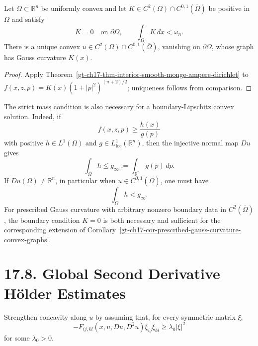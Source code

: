 \begin{corollary}
\label{gt-ch17-cor-prescribed-gauss-curvature-convex-graphs}
Let $\Omega\subset\mathbb R^n$ be uniformly convex and let
$K\in C^2(\Omega)\cap C^{0,1}(\overline\Omega)$ be positive in $\Omega$ and
satisfy
\begin{equation}\tag{17.81}
K=0\quad\text{on }\partial\Omega,
\qquad \int_\Omega K\,dx<\omega_n.
\end{equation}
There is a unique convex
$u\in C^2(\Omega)\cap C^{0,1}(\overline\Omega)$, vanishing on
$\partial\Omega$, whose graph has Gauss curvature $K(x)$.
\end{corollary}
\begin{proof}
\sketch Apply Theorem~\ref{gt-ch17-thm-interior-smooth-monge-ampere-dirichlet} to
$f(x,z,p)=K(x)(1+|p|^2)^{(n+2)/2}$; uniqueness follows from comparison.
\end{proof}

The strict mass condition is also necessary for a boundary-Lipschitz convex
solution.  Indeed, if
\begin{equation}\tag{17.82}
f(x,z,p)\ge\frac{h(x)}{g(p)}
\end{equation}
with positive $h\in L^1(\Omega)$ and
$g\in L^1_{\mathrm{loc}}(\mathbb R^n)$, then the injective normal map
$Du$ gives
\begin{equation}\tag{17.83}
\int_\Omega h\le g_\infty:=\int_{\mathbb R^n}g(p)\,dp.
\end{equation}
If $Du(\Omega)\ne\mathbb R^n$, in particular when
$u\in C^{0,1}(\overline\Omega)$, one must have
\begin{equation}\tag{17.84}
\int_\Omega h<g_\infty.
\end{equation}
For prescribed Gauss curvature with arbitrary nonzero boundary data in
$C^2(\overline\Omega)$, the boundary condition $K=0$ is both necessary and
sufficient for the corresponding extension of
Corollary~\ref{gt-ch17-cor-prescribed-gauss-curvature-convex-graphs}.

\section*{17.8. Global Second Derivative H\"older Estimates}

Strengthen concavity along $u$ by assuming that, for every symmetric matrix
$\xi$,
\begin{equation}\tag{17.85}
-F_{ij,kl}(x,u,Du,D^2u)\xi_{ij}\xi_{kl}\ge\lambda_0|\xi|^2
\end{equation}
for some $\lambda_0>0$.

